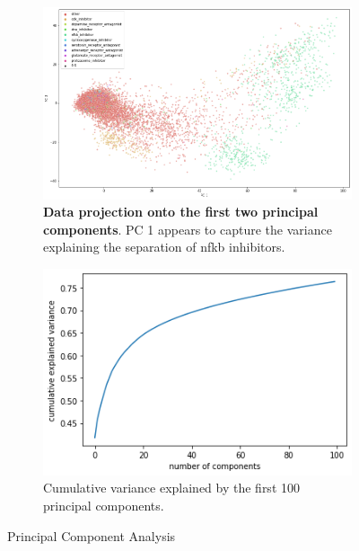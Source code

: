 \documentclass[bsc,frontabs,twoside,singlespacing,parskip,deptreport]{infthesis}     %
\begin{document}
\begin{figure}[h!]
\centering
\begin{subfigure}{.9\textwidth}
 
  \centering
  \includegraphics[width=1\linewidth]{images/pca.png}
  \caption{\textbf{Data projection onto the first two principal components}. PC 1 appears to capture the variance explaining the separation of nfkb inhibitors.}
  \label{pca map}
\end{subfigure}
\begin{subfigure}{.9\textwidth}
  \centering
  \includegraphics[width=.6\linewidth]{images/cum_variance.png}
  \caption{Cumulative variance explained by the first 100 principal components.}
  \label{cum_cvar}
  \end{subfigure}
  \caption{Principal Component Analysis}
\end{figure}

\end{document}
